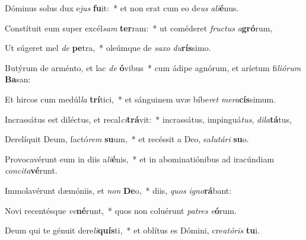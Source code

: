 \item Dóminus solus dux e\textit{jus} \textbf{fu}it:~* et non erat cum eo de\textit{us} \textit{a}\textit{li}\textbf{é}nus.
\item Constítuit eum super excél\textit{sam} \textbf{ter}ram:~* ut coméderet \textit{fruc}\textit{tus} \textit{a}\textbf{gró}rum,
\item Ut súgeret mel \textit{de} \textbf{pe}tra,~* oleúmque de \textit{sa}\textit{xo} \textit{du}\textbf{rís}simo.
\item Butýrum de arménto, et lac \textit{de} \textbf{ó}vibus~* cum ádipe agnórum, et aríetum fi\textit{li}\textit{ó}\textit{rum} \textbf{Ba}san:
\item Et hircos cum medúl\textit{la} \textbf{trí}tici,~* et sánguinem uvæ bíbe\textit{ret} \textit{me}\textit{ra}\textbf{cís}simum.
\item Incrassátus est diléctus, et recal\textit{ci}\textbf{trá}vit:~* incrassátus, impinguá\textit{tus}, \textit{di}\textit{la}\textbf{tá}tus,
\item Derelíquit Deum, factó\textit{rem} \textbf{su}um,~* et recéssit a Deo, sa\textit{lu}\textit{tá}\textit{ri} \textbf{su}o.
\item Provocavérunt eum in diis a\textit{li}\textbf{é}nis,~* et in abominatiónibus ad iracúndiam \textit{con}\textit{ci}\textit{ta}\textbf{vé}runt.
\item Immolavérunt dæmóniis, et \textit{non} \textbf{De}o,~* diis, \textit{quos} \textit{i}\textit{gno}\textbf{rá}bant:
\item Novi recentésque \textit{ve}\textbf{né}runt,~* quos non coluérunt \textit{pa}\textit{tres} \textit{e}\textbf{ó}rum.
\item Deum qui te génuit dere\textit{li}\textbf{quís}ti,~* et oblítus es Dómini, cre\textit{a}\textit{tó}\textit{ris} \textbf{tu}i.
